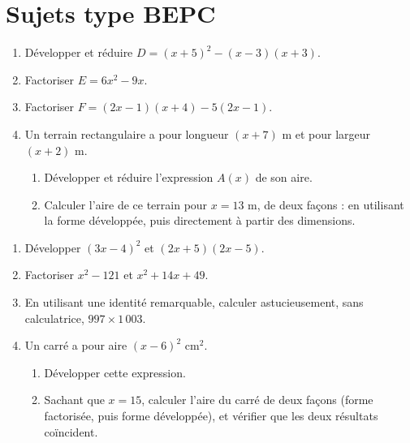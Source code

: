 \section{Sujets type BEPC}

\begin{enumerate}[label=\arabic*)]
\item Développer et réduire $D=(x+5)^{2}-(x-3)(x+3)$.
\item Factoriser $E=6x^{2}-9x$.
\item Factoriser $F=(2x-1)(x+4)-5(2x-1)$.
\item Un terrain rectangulaire a pour longueur $(x+7)$ m et pour largeur $(x+2)$ m.
\begin{enumerate}[label=\alph*)]
\item Développer et réduire l'expression $A(x)$ de son aire.
\item Calculer l'aire de ce terrain pour $x=13$ m, de deux façons : en utilisant la forme
développée, puis directement à partir des dimensions.
\end{enumerate}
\end{enumerate}

\begin{enumerate}[label=\arabic*)]
\item Développer $(3x-4)^{2}$ et $(2x+5)(2x-5)$.
\item Factoriser $x^{2}-121$ et $x^{2}+14x+49$.
\item En utilisant une identité remarquable, calculer astucieusement, sans calculatrice,
$997\times1\,003$.
\item Un carré a pour aire $(x-6)^{2}$ cm$^{2}$.
\begin{enumerate}[label=\alph*)]
\item Développer cette expression.
\item Sachant que $x=15$, calculer l'aire du carré de deux façons (forme factorisée, puis
forme développée), et vérifier que les deux résultats coïncident.
\end{enumerate}
\end{enumerate}

